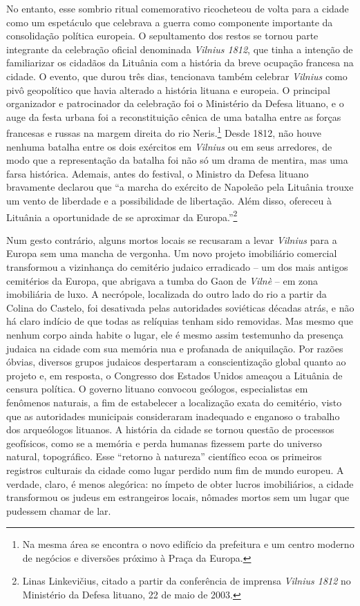 No entanto, esse sombrio ritual comemorativo ricocheteou de volta para a
cidade como um espetáculo que celebrava a guerra como componente
importante da consolidação política europeia. O sepultamento dos restos
se tornou parte integrante da celebração oficial denominada \textit{Vilnius
1812}, que tinha a intenção de familiarizar os cidadãos da Lituânia com
a história da breve ocupação francesa na cidade. O evento, que durou
três dias, tencionava também celebrar \textit{Vilnius} como pivô geopolítico que
havia alterado a história lituana e europeia. O principal organizador e
patrocinador da celebração foi o Ministério da Defesa lituano, e o auge
da festa urbana foi a reconstituição cênica de uma batalha entre as
forças francesas e russas na margem direita do rio Neris.\footnote{Na
mesma área se encontra o novo edifício da prefeitura e um centro
moderno de negócios e diversões próximo à Praça da Europa.} Desde 1812,
não houve nenhuma batalha entre os dois exércitos em \textit{Vilnius} ou em seus
arredores, de modo que a representação da batalha foi não só um drama de
mentira, mas uma farsa histórica. Ademais, antes do festival, o Ministro
da Defesa lituano bravamente declarou que ``a marcha do exército de
Napoleão pela Lituânia trouxe um vento de liberdade e a possibilidade de
libertação. Além disso, ofereceu à Lituânia a oportunidade de se
aproximar da Europa.''\footnote{Linas Linkevičius, citado a partir da conferência de imprensa \textit{Vilnius 1812} no Ministério da Defesa lituano, 22 de maio de 2003.}

Num gesto contrário, alguns mortos locais se recusaram a levar \textit{Vilnius}
para a Europa sem uma mancha de vergonha. Um novo projeto imobiliário
comercial transformou a vizinhança do cemitério judaico erradicado -- um
dos mais antigos cemitérios da Europa, que abrigava a tumba do Gaon de
\textit{Vilnè} -- em zona imobiliária de luxo. A necrópole, localizada do outro
lado do rio a partir da Colina do Castelo, foi desativada pelas
autoridades soviéticas décadas atrás, e não há claro indício de que
todas as relíquias tenham sido removidas. Mas mesmo que nenhum corpo
ainda habite o lugar, ele é mesmo assim testemunho da presença judaica
na cidade com sua memória nua e profanada de aniquilação. Por razões
óbvias, diversos grupos judaicos despertaram a conscientização global
quanto ao projeto e, em resposta, o Congresso dos Estados Unidos ameaçou
a Lituânia de censura política. O governo lituano convocou geólogos, 
especialistas em fenômenos naturais, a fim de estabelecer a localização
exata do cemitério, visto que as autoridades municipais consideraram
inadequado e enganoso o trabalho dos arqueólogos lituanos. A história da cidade se tornou questão de processos
geofísicos, como se a memória e perda humanas fizessem parte do universo
natural, topográfico. Esse ``retorno à natureza'' científico ecoa os
primeiros registros culturais da cidade como lugar perdido num fim de
mundo europeu. A verdade, claro, é menos alegórica: no ímpeto de obter
lucros imobiliários, a cidade transformou os judeus em estrangeiros
locais, nômades mortos sem um lugar que pudessem chamar de lar.

